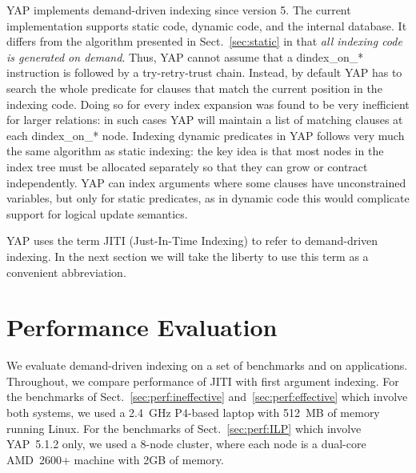 \documentclass{llncs}
\newcommand{\instr}[1]{\textsf{#1}}
\newcommand{\TryRetryTrust}{\mbox{\instr{try-retry-trust}}\xspace}
\newcommand{\jitiSTAR}{\mbox{\instr{dindex\_on\_*}}\xspace}
\newcommand{\JITI}{demand-driven indexing\xspace}
\begin{document}
YAP implements \JITI since version 5. The current implementation
supports static code, dynamic code, and the internal database. It
differs from the algorithm presented in Sect.~\ref{sec:static} in that
\emph{all indexing code is generated on demand}. Thus, YAP cannot
assume that a \jitiSTAR instruction is followed by a \TryRetryTrust
chain. Instead, by default YAP has to search the whole predicate for
clauses that match the current position in the indexing code. Doing so
for every index expansion was found to be very inefficient for larger
relations: in such cases YAP will maintain a list of matching clauses
at each \jitiSTAR node. Indexing dynamic predicates in YAP follows
very much the same algorithm as static indexing: the key idea is that
most nodes in the index tree must be allocated separately so that they
can grow or contract independently. YAP can index arguments where some
clauses have unconstrained variables, but only for static predicates,
as in dynamic code this would complicate support for logical update
semantics.

YAP uses the term JITI (Just-In-Time Indexing) to refer to \JITI. In
the next section we will take the liberty to use this term as a
convenient abbreviation.


\section{Performance Evaluation} \label{sec:perf}
We evaluate \JITI on a set of benchmarks and on applications.
Throughout, we compare performance of JITI with first argument
indexing. For the benchmarks of Sect.~\ref{sec:perf:ineffective}
and~\ref{sec:perf:effective} which involve both systems, we used a
2.4~GHz P4-based laptop with 512~MB of memory running Linux.
For the benchmarks of Sect.~\ref{sec:perf:ILP} which involve
YAP~5.1.2 only, we used a 8-node cluster, where each node is a
dual-core AMD~2600+ machine with 2GB of memory.
\end{document}
